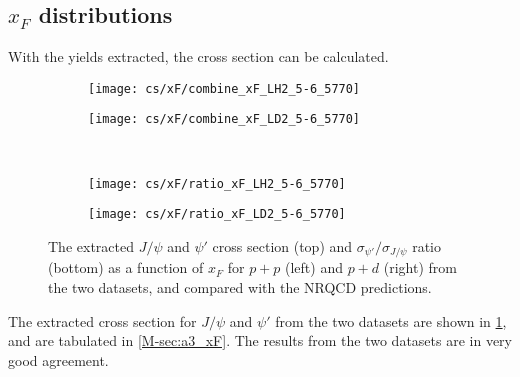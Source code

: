 \documentclass[../main.tex]{subfiles}
\begin{document}
\subsection{\texorpdfstring{$x_F$}{x\_F} distributions}
With the yields extracted, the cross section can be calculated.
\begin{figure}[h!]
	\centering
	\begin{subfigure}{0.45\linewidth}
		\texttt{[image: cs/xF/combine\_xF\_LH2\_5-6\_5770]}
	\end{subfigure}
	\centering
	\begin{subfigure}{0.45\linewidth}
		\texttt{[image: cs/xF/combine\_xF\_LD2\_5-6\_5770]}
	\end{subfigure}
	\\
	\begin{subfigure}{0.45\linewidth}
		\texttt{[image: cs/xF/ratio\_xF\_LH2\_5-6\_5770]}
	\end{subfigure}
	\begin{subfigure}{0.45\linewidth}
		\texttt{[image: cs/xF/ratio\_xF\_LD2\_5-6\_5770]}
	\end{subfigure}
	\caption{The extracted $J/\psi$ and $\psi'$ cross section (top) and $\sigma_{\psi'}/\sigma_{J/\psi}$
		ratio (bottom) as a function of $x_F$ for $p+p$ (left) and $p+d$ (right) from the two datasets,
		and compared with the NRQCD predictions.}
	\label{fig:cs_xF}
\end{figure}
The extracted cross section for $J/\psi$ and $\psi'$ from the two datasets are shown in \cref{fig:cs_xF}, and are
tabulated in \cref{M-sec:a3_xF}.
The results from the two datasets are in very good agreement.
\FloatBarrier
\end{document}
